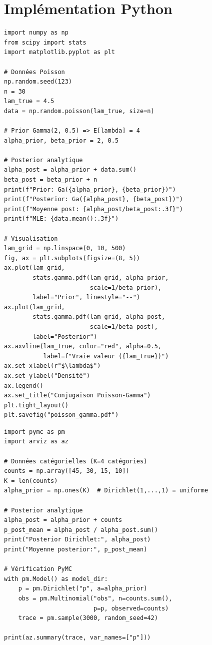 \section{Impl\'ementation Python}

\begin{codeblock}[title=\textbf{Conjugaison Poisson--Gamma}]
\begin{verbatim}
import numpy as np
from scipy import stats
import matplotlib.pyplot as plt

# Données Poisson
np.random.seed(123)
n = 30
lam_true = 4.5
data = np.random.poisson(lam_true, size=n)

# Prior Gamma(2, 0.5) => E[lambda] = 4
alpha_prior, beta_prior = 2, 0.5

# Posterior analytique
alpha_post = alpha_prior + data.sum()
beta_post = beta_prior + n
print(f"Prior: Ga({alpha_prior}, {beta_prior})")
print(f"Posterior: Ga({alpha_post}, {beta_post})")
print(f"Moyenne post: {alpha_post/beta_post:.3f}")
print(f"MLE: {data.mean():.3f}")

# Visualisation
lam_grid = np.linspace(0, 10, 500)
fig, ax = plt.subplots(figsize=(8, 5))
ax.plot(lam_grid,
        stats.gamma.pdf(lam_grid, alpha_prior,
                        scale=1/beta_prior),
        label="Prior", linestyle="--")
ax.plot(lam_grid,
        stats.gamma.pdf(lam_grid, alpha_post,
                        scale=1/beta_post),
        label="Posterior")
ax.axvline(lam_true, color="red", alpha=0.5,
           label=f"Vraie valeur ({lam_true})")
ax.set_xlabel(r"$\lambda$")
ax.set_ylabel("Densité")
ax.legend()
ax.set_title("Conjugaison Poisson-Gamma")
plt.tight_layout()
plt.savefig("poisson_gamma.pdf")
\end{verbatim}
\end{codeblock}

\begin{codeblock}[title=\textbf{Conjugaison Multinomiale--Dirichlet}]
\begin{verbatim}
import pymc as pm
import arviz as az

# Données catégorielles (K=4 catégories)
counts = np.array([45, 30, 15, 10])
K = len(counts)
alpha_prior = np.ones(K)  # Dirichlet(1,...,1) = uniforme

# Posterior analytique
alpha_post = alpha_prior + counts
p_post_mean = alpha_post / alpha_post.sum()
print("Posterior Dirichlet:", alpha_post)
print("Moyenne posterior:", p_post_mean)

# Vérification PyMC
with pm.Model() as model_dir:
    p = pm.Dirichlet("p", a=alpha_prior)
    obs = pm.Multinomial("obs", n=counts.sum(),
                         p=p, observed=counts)
    trace = pm.sample(3000, random_seed=42)

print(az.summary(trace, var_names=["p"]))
\end{verbatim}
\end{codeblock}

